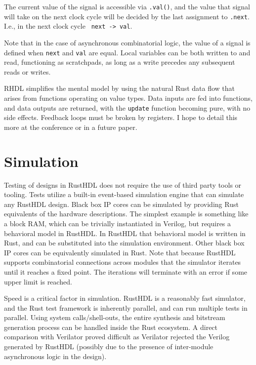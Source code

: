 \documentclass[sigplan,screen,sigconf]{acmart}
\begin{document}
\begin{tcolorbox}
The current value of the signal is accessible via \verb|.val()|, and the value that 
signal will take on the next clock cycle will be decided by the last assignment
to \verb|.next|.  I.e., in the next clock cycle \verb| next -> val|.
\end{tcolorbox}

Note that in the case of asynchronous combinatorial logic, the value of a signal 
is defined when \verb|next| and \verb|val| are equal. Local variables can be both 
written to and read, functioning as scratchpads, as long as a write precedes any 
subsequent reads or writes.

RHDL simplifies the mental model by using the natural Rust data flow that arises
from functions operating on value types.  Data inputs are fed into functions, and
data outputs are returned, with the \verb|update| function becoming pure, with
no side effects. Feedback loops must be broken by registers.  I hope
to detail this more at the conference or in a future paper.


\section{Simulation}
Testing of designs in RustHDL does not require the use of third party tools or tooling.  
Tests utilize a built-in event-based simulation engine that can simulate any RustHDL 
design. Black box IP cores can be simulated by providing Rust equivalents of the 
hardware descriptions. The simplest example is something like a block RAM, which can 
be trivially instantiated in Verilog, but requires a behavioral model in RustHDL.  In 
RustHDL that behavioral model is written in Rust, and can be substituted into the 
simulation environment.  Other black box IP cores can be equivalently simulated in Rust. 
Note that because RustHDL supports combinatorial connections across modules that the
simulator iterates until it reaches a fixed point.  The iterations will terminate 
with an error if some upper limit is reached.

Speed is a critical factor in simulation.  RustHDL is a reasonably fast simulator, 
and the Rust test framework is inherently parallel, and can run multiple tests in 
parallel. Using system calls/shell-outs, the entire synthesis and bitstream generation
 process can be handled inside the Rust ecosystem.  A direct comparison with Verilator 
 proved difficult as Verilator rejected the Verilog generated by RustHDL (possibly due 
 to the presence of inter-module asynchronous logic in the design). 
\end{document}
